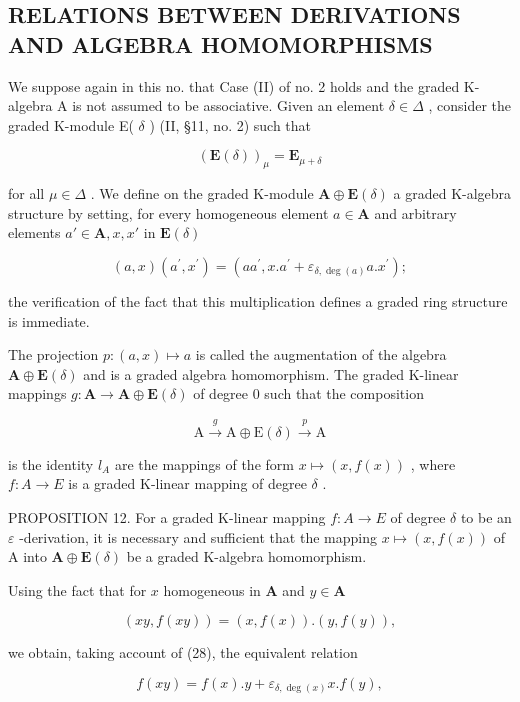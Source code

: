 \subsection{RELATIONS BETWEEN DERIVATIONS AND ALGEBRA HOMOMORPHISMS}

We suppose again in this no. that Case (II) of no. 2 holds and the graded K-algebra A is not assumed to be associative. Given an element \(\delta \in \Delta\) , consider the graded K-module E( \(\delta\) ) (II, §11, no. 2) such that

\[
(\mathbf {E} (\delta)) _ {\mu} = \mathbf {E} _ {\mu + \delta}
\]

for all \(\mu \in \Delta\) . We define on the graded K-module \(\mathbf{A} \oplus \mathbf{E}(\delta)\) a graded K-algebra structure by setting, for every homogeneous element \(a \in \mathbf{A}\) and arbitrary elements \(a' \in \mathbf{A}, x, x'\) in \(\mathbf{E}(\delta)\)

\[
(a, x) \left(a ^ {\prime}, x ^ {\prime}\right) = \left(a a ^ {\prime}, x. a ^ {\prime} + \varepsilon_ {\delta, \deg (a)} a. x ^ {\prime}\right);\tag{28}
\]

the verification of the fact that this multiplication defines a graded ring structure is immediate.

The projection \(p:(a,x)\mapsto a\) is called the augmentation of the algebra \(\mathbf{A}\oplus\mathbf{E}(\delta)\) and is a graded algebra homomorphism. The graded K-linear mappings \(g:\mathbf{A}\to\mathbf{A}\oplus\mathbf{E}(\delta)\) of degree 0 such that the composition

\[
\mathrm{A} \xrightarrow {g} \mathrm{A} \oplus \mathrm{E} (\delta) \xrightarrow {p} \mathrm{A}
\]

is the identity \(l_{A}\) are the mappings of the form \(x \mapsto (x, f(x))\) , where \(f: A \to E\) is a graded K-linear mapping of degree \(\delta\) .

PROPOSITION 12. For a graded K-linear mapping \(f:A\to E\) of degree \(\delta\) to be an \(\varepsilon\) -derivation, it is necessary and sufficient that the mapping \(x\mapsto(x,f(x))\) of A into \(\mathbf{A}\oplus\mathbf{E}(\delta)\) be a graded K-algebra homomorphism.

Using the fact that for \(x\) homogeneous in \(\mathbf{A}\) and \(y \in \mathbf{A}\)

\[
(x y, f (x y)) = (x, f (x)). (y, f (y)),
\]

we obtain, taking account of (28), the equivalent relation

\[
f (x y) = f (x). y + \varepsilon_ {\delta , \deg (x)} x. f (y),
\]

